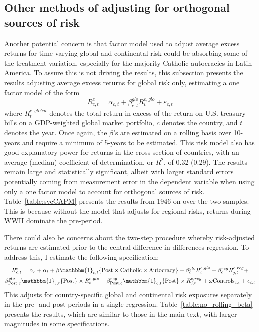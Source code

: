 

\subsection{Other methods of adjusting for orthogonal sources of risk}\label{section:globalCAPM}

Another potential concern is that factor model used to adjust average excess returns for time-varying global and continental risk could be absorbing some of the treatment variation, especially for the majority Catholic autocracies in Latin America. To assure this is not driving the results, this subsection presents the results adjusting average excess returns for global risk only, estimating a one factor model of the form
\begin{equation}
R^e_{c,t} = \alpha_{c,t} + \beta^{glo}_{c,t} R^{e,glo}_t + \varepsilon_{c,t}\label{eq:oneFactor}
\end{equation}
where $R^{e,global}_t$ denotes the total return in excess of the return on U.S. treasury bills on a GDP-weighted global market portfolio, $c$ denotes the country,  and $t$ denotes the year. Once again, the $\beta$'s are estimated on a rolling basis over 10-years and require a minimum of 5-years to be estimated. This risk model also has good explanatory power for returns in the cross-section of countries, with an average (median) coefficient of determination, or $R^2$, of 0.32 (0.29).  The results remain large and statistically significant, albeit with larger standard errors potentially coming from measurement error in the dependent variable when using only a one factor model to account for orthogonal sources of risk. Table~\ref{table:svcCAPM} presents the results from 1946 on over the two samples. This is because without the model that adjusts for regional risks, returns during WWII dominate the pre-period.



There could also be concerns about the two-step procedure whereby risk-adjusted returns are estimated prior to the central difference-in-differences regression. To address this, I estimate the following specification:
\begin{multline}
R^e_{c,t} = \alpha_{c}+\alpha_{t} +\beta\mathbbm{1}_{c,t}\{\textrm{Post}\times\textrm{Catholic}\times\textrm{Autocracy}\} + \beta^{glo}_c R^{e,glo}_t + \beta^{reg}_c R^{e,reg}_{j,t} + \\ \beta^{glo}_{\text{Post},c} \mathbbm{1}_{c,t}\{\textrm{Post}\} \times R^{e,glo}_t + \beta^{reg}_{\text{Post},c} \mathbbm{1}_{c,t}\{\textrm{Post}\} \times R^{e,reg}_{j,t}  +\mathbf{\omega} \textrm{Controls}_{c,t}+\epsilon_{c,t} \label{eq:twoFactorDiD}
\end{multline}
This adjusts for country-specific global and continental risk exposures separately in the pre- and post-periods in a single regression. Table~\ref{table:no_rolling_beta} presents the results, which are similar to those in the main text, with larger magnitudes in some specifications.

